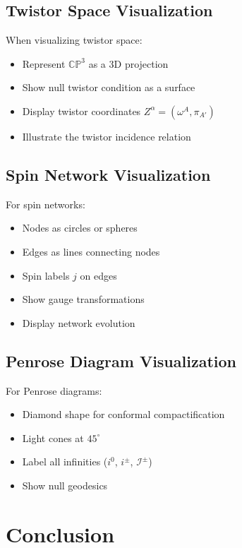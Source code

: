 \documentclass[12pt,a4paper]{article}
\begin{document}
\subsection{Twistor Space Visualization}

When visualizing twistor space:
\begin{itemize}
    \item Represent $\mathbb{CP}^3$ as a 3D projection
    \item Show null twistor condition as a surface
    \item Display twistor coordinates $Z^\alpha = (\omega^A, \pi_{A'})$
    \item Illustrate the twistor incidence relation
\end{itemize}

\subsection{Spin Network Visualization}

For spin networks:
\begin{itemize}
    \item Nodes as circles or spheres
    \item Edges as lines connecting nodes
    \item Spin labels $j$ on edges
    \item Show gauge transformations
    \item Display network evolution
\end{itemize}

\subsection{Penrose Diagram Visualization}

For Penrose diagrams:
\begin{itemize}
    \item Diamond shape for conformal compactification
    \item Light cones at $45^\circ$
    \item Label all infinities ($i^0$, $i^\pm$, $\mathscr{I}^\pm$)
    \item Show null geodesics
\end{itemize}

\section{Conclusion}
\end{document}
